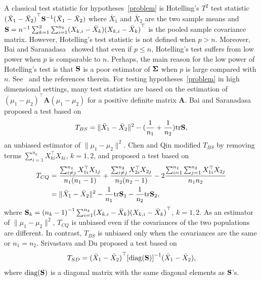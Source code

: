 \documentclass[times,sort&compress,3p]{elsarticle}
\newcommand{\mytr}{\rm tr}
\newcommand{\BA}{\mathbf{A}}    \newcommand{\BB}{\mathbf{B}}    \newcommand{\BC}{\mathbf{C}}    \newcommand{\BD}{\mathbf{D}}    \newcommand{\BE}{\mathbf{E}}    \newcommand{\BF}{\mathbf{F}}    \newcommand{\BG}{\mathbf{G}}    \newcommand{\BH}{\mathbf{H}}    \newcommand{\BI}{\mathbf{I}}    \newcommand{\BJ}{\mathbf{J}}    \newcommand{\BK}{\mathbf{K}}    \newcommand{\BL}{\mathbf{L}}
\theoremstyle{plain}
\theoremstyle{definition}
\theoremstyle{remark}
\begin{document}
A classical test statistic for hypotheses~\eqref{problem} is Hotelling's $T^2$ test  statistic ${(\bar{X}_1-\bar{X}_2)}^\top  \mathbf{S}^{-1}(\bar{X}_1-\bar{X}_2)$ where $\bar{X}_1$ and $\bar{X}_2$ are the two sample means and
    $
    \mathbf{S}=
n^{-1}\sum_{k=1}^2\sum_{i=1}^{n_k} (X_{k,i}-\bar{X}_k) {(X_{k,i}-\bar{X}_k)}^\top 
    $
is the pooled sample covariance matrix.
However, Hotelling's test statistic is not defined when $p>n$.
Moreover, Bai and Saranadasa~\cite{Bai1996Efiect} showed that even if $p\leq n$, Hotelling's test suffers from low power when $p$ is comparable to $n$.
Perhaps, the main reason for the low power of Hotelling's test is that $\mathbf{S}$ is a poor estimator of $\boldsymbol{\Sigma}$ when $p$ is large compared with $n$.
See~\cite{Chen2010A} and the references therein.
For testing hypotheses~\eqref{problem} in high dimensional settings,  
many test statistics are based on the estimation of  ${(\mu_1-\mu_2)}^\top  \BA(\mu_1-\mu_2)$ for a positive definite matrix $\BA$. Bai and Saranadasa~\cite{Bai1996Efiect} proposed a test based on
\begin{equation*}
    T_{BS}=\|\bar{X}_1-\bar{X}_2\|^2-(\frac{1}{n_1}+\frac{1}{n_2})\mytr \BS,
\end{equation*}
an unbiased estimator of $\|\mu_1-\mu_2\|^2$.
Chen and Qin \cite{Chen2010A} modified $T_{BS}$ by removing terms $\sum_{i=1}^{n_k}X_{ki}^\top  X_{ki}$, $k=1,2$, and proposed a test based on
\begin{equation*}
    \begin{aligned}
        T_{CQ}&=\frac{\sum_{i\neq j}^{n_1}X_{1i}^\top  X_{1j}}{n_1(n_1-1)}+\frac{\sum_{i\neq j}^{n_2}X_{2i}^\top  X_{2j}}{n_2(n_2-1)}-2\frac{\sum_{i=1}^{n_1}\sum_{j=1}^{n_2}X_{1i}^\top  X_{2j}}{n_1n_2}
        \\
            &=\|\bar{X}_1-\bar{X}_2\|^2-\frac{1}{n_1}\mytr \BS_1-\frac{1}{n_2}\mytr \BS_2,
    \end{aligned}
\end{equation*}
where
$\mathbf{S}_k={(n_k -1)}^{-1}\sum_{i=1}^{n_k} (X_{k,i}-\bar{X}_k) {(X_{k,i}-\bar{X}_k)}^\top 
$, $k=1,2$.
As an estimator of $\|\mu_1-\mu_2\|^2$, $T_{CQ}$ is unbiased even if the covariances of the two populations are different.
In contrast, $T_{BS}$ is unbiased only when the covariances are the same or $n_1=n_2$.
Srivastava and Du \cite{Srivastava2008A} proposed a test based on
\begin{equation*}
    T_{SD}={(\bar{X}_1-\bar{X}_2)}^\top  {[\mathrm{diag}(\mathbf{S})]}^{-1}(\bar{X}_1-\bar{X}_2),
\end{equation*}
where $\textrm{diag} (\mathbf{S})$ is a diagonal matrix with the same diagonal elements as $\mathbf{S}$'s.
\end{document}
